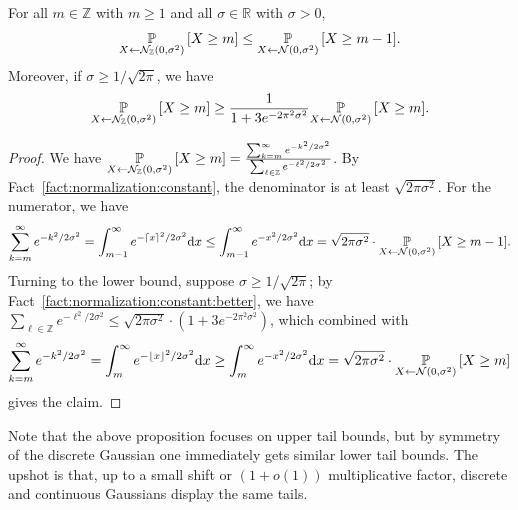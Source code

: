 \documentclass{jpcfinal} %
\newcommand{\dgausss}[2]{{\discN\left(#1,#2\right)}}
\newcommand{\dgauss}[1]{\dgausss{0}{#1}}
\newcommand{\pr}[2]{{\ifx&#1& \mathbb{P} \else
\underset{#1}{\mathbb{P}} \fi \left[#2\right]}}
\newcommand{\dx}[1][x]{\mathrm{d}#1}
\newcommand{\Z}{\mathbb{Z}}
\newcommand{\R}{\mathbb{R}}
\begin{document}
\begin{prop}\label{prop:tail:bound:gaussian}
For all $m \in \Z$ with $m \ge 1$ and all $\sigma \in \R$ with $\sigma>0$, 
\begin{equation}
    \pr{X \gets \dgauss{\sigma^2}}{X \ge m} \le \pr{X \gets \mathcal{N}(0,\sigma^2)}{X \ge m-1}.
\end{equation}
Moreover, if $\sigma \geq 1/\sqrt{2\pi}$, we have
\begin{equation}
    \pr{X \gets \dgauss{\sigma^2}}{X \ge m} \ge \frac{1}{1+3e^{-2\pi^2\sigma^2}}\pr{X \gets \mathcal{N}(0,\sigma^2)}{X \ge m}.
\end{equation}
\end{prop}
\begin{proof}
We have $\pr{X \gets \dgauss{\sigma^2}}{X \ge m} = \frac{\sum_{k=m}^\infty e^{-k^2/2\sigma^2}}{\sum_{\ell\in \Z} e^{-\ell^2/2\sigma^2}}$. 
By Fact~\ref{fact:normalization:constant}, the denominator is at least $\sqrt{2\pi\sigma^2}$.
For the numerator, we have 
\[
    \sum_{k=m}^\infty e^{-k^2/2\sigma^2} 
    = \int_{m-1}^\infty e^{-\lceil x \rceil^2/2\sigma^2} \dx 
    \le \int_{m-1}^\infty e^{-x^2/2\sigma^2}\dx 
    = \sqrt{2\pi\sigma^2}\cdot\pr{X \gets \mathcal{N}(0,\sigma^2)}{X \ge m-1}.
\]
Turning to the lower bound, suppose $\sigma \geq 1/\sqrt{2\pi}$; by Fact~\ref{fact:normalization:constant:better}, we have $\sum_{\ell\in \Z} e^{-\ell^2/2\sigma^2}\leq \sqrt{2\pi\sigma^2}\cdot(1+3e^{-2\pi^2\sigma^2})$, which combined with
\[
    \sum_{k=m}^\infty e^{-k^2/2\sigma^2} 
    = \int_{m}^\infty e^{-\lfloor x \rfloor^2/2\sigma^2} \dx 
    \ge \int_{m}^\infty e^{-x^2/2\sigma^2}\dx 
    = \sqrt{2\pi\sigma^2}\cdot\pr{X \gets \mathcal{N}(0,\sigma^2)}{X \ge m}
\]
gives the claim.
\end{proof}
Note that the above proposition focuses on upper tail bounds, but by symmetry of the discrete Gaussian one immediately gets similar lower tail bounds. The upshot is that, up to a small shift or $(1+o(1))$ multiplicative factor, discrete and continuous Gaussians display the same tails.
\end{document}
